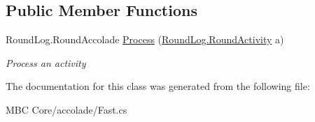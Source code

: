 \subsection*{Public Member Functions}
\begin{DoxyCompactItemize}
\item 
\hypertarget{class_m_b_c_1_1_core_1_1mbc_1_1accolade_1_1_fast_a889ec0b12577dc5ca345d281f00fbba2}{Round\-Log.\-Round\-Accolade \hyperlink{class_m_b_c_1_1_core_1_1mbc_1_1accolade_1_1_fast_a889ec0b12577dc5ca345d281f00fbba2}{Process} (\hyperlink{class_m_b_c_1_1_core_1_1_round_log_1_1_round_activity}{Round\-Log.\-Round\-Activity} a)}\label{class_m_b_c_1_1_core_1_1mbc_1_1accolade_1_1_fast_a889ec0b12577dc5ca345d281f00fbba2}

\begin{DoxyCompactList}\small\item\em Process an activity\end{DoxyCompactList}\end{DoxyCompactItemize}


The documentation for this class was generated from the following file\-:\begin{DoxyCompactItemize}
\item 
M\-B\-C Core/accolade/Fast.\-cs\end{DoxyCompactItemize}
